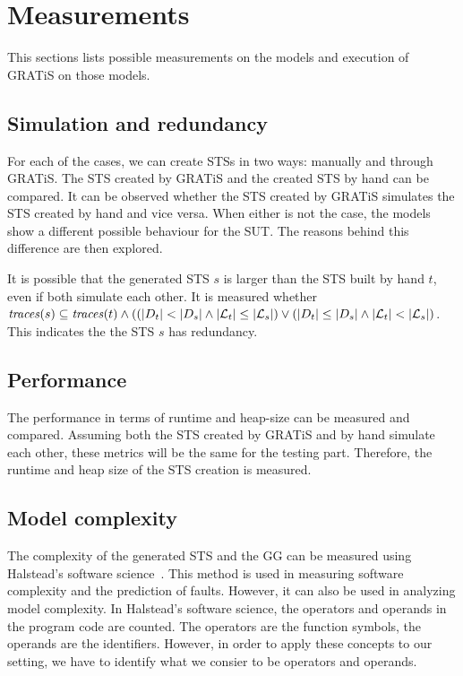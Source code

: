 \section{Measurements}\label{sec:measurements}

This sections lists possible measurements on the models and execution of GRATiS on those models.

\subsection{Simulation and redundancy}
For each of the cases, we can create STSs in two ways: manually and through GRATiS. The STS created by GRATiS and the created STS by hand can be compared. It can be observed whether the STS created by GRATiS simulates the STS created by hand and vice versa. When either is not the case, the models show a different possible behaviour for the SUT. The reasons behind this difference are then explored. 

It is possible that the generated STS $s$ is larger than the STS built by hand $t$, even if both simulate each other. It is measured whether $\mathit{traces}(s) \subseteq \mathit{traces}(t) \land ((|D_t| < |D_s| \land |\mathcal{L}_t| \leq |\mathcal{L}_s|) \lor (|D_t| \leq |D_s| \land |\mathcal{L}_t| < |\mathcal{L}_s|)$. This indicates the the STS $s$ has redundancy.

\subsection{Performance}
The performance in terms of runtime and heap-size can be measured and compared. Assuming both the STS created by GRATiS and by hand simulate each other, these metrics will be the same for the testing part. Therefore, the runtime and heap size of the STS creation is measured.

\subsection{Model complexity}\label{sec:complexity_measurement}
The complexity of the generated STS and the GG can be measured using Halstead's software science~\cite{Halstead:software-science}. This method is used in measuring software complexity and the prediction of faults. However, it can also be used in analyzing model complexity. In Halstead's software science, the operators and operands in the program code are counted. The operators are the function symbols, the operands are the identifiers. However, in order to apply these concepts to our setting, we have to identify what we consier to be operators and operands.

